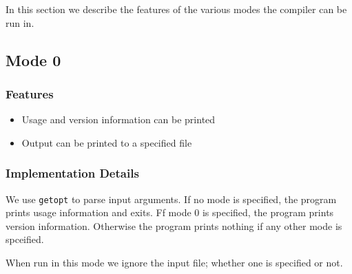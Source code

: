 \documentclass{article}
\begin{document}
In this section we describe the features of the various modes the compiler can be run in.

\subsection{Mode 0}

\subsubsection{Features}

\begin{itemize}
    \item Usage and version information can be printed
    \item Output can be printed to a specified file
\end{itemize}

\subsubsection{Implementation Details}

We use \verb|getopt| to parse input arguments. If no mode is specified, the program prints usage information and exits. Ff mode 0 is specified, the program prints version information. Otherwise the program prints nothing if any other mode is spceified. 

When run in this mode we ignore the input file; whether one is specified or not.
\end{document}
